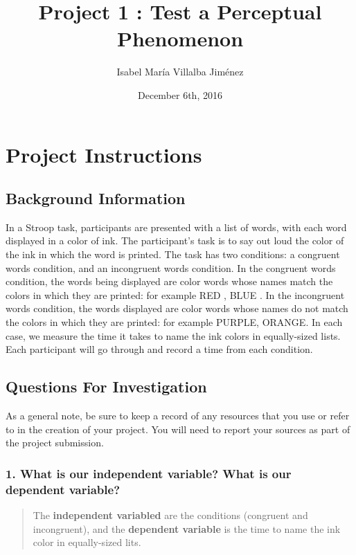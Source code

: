 \documentclass[]{article}
\title{Project 1 : Test a Perceptual Phenomenon}
\author{Isabel María Villalba Jiménez}
\date{December 6th, 2016}
\begin{document}
\maketitle

\section{Project Instructions}\label{project-instructions}

\subsection{Background Information}\label{background-information}

In a Stroop task, participants are presented with a list of words, with
each word displayed in a color of ink. The participant's task is to say
out loud the color of the ink in which the word is printed. The task has
two conditions: a congruent words condition, and an incongruent words
condition. In the congruent words condition, the words being displayed
are color words whose names match the colors in which they are printed:
for example {RED }, {BLUE }. In the incongruent words condition, the
words displayed are color words whose names do not match the colors in
which they are printed: for example {PURPLE}, { ORANGE}. In each case,
we measure the time it takes to name the ink colors in equally-sized
lists. Each participant will go through and record a time from each
condition.

\subsection{Questions For
Investigation}\label{questions-for-investigation}

As a general note, be sure to keep a record of any resources that you
use or refer to in the creation of your project. You will need to report
your sources as part of the project submission.

\subsubsection{1. What is our independent variable? What is our
dependent
variable?}\label{what-is-our-independent-variable-what-is-our-dependent-variable}

\begin{quote}
The \textbf{independent variabled} are the conditions (congruent and
incongruent), and the \textbf{dependent variable} is the time to name
the ink color in equally-sized lits.
\end{quote}
\end{document}
